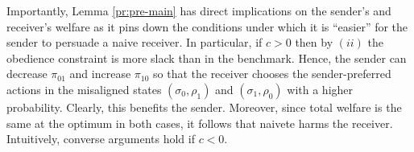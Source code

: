 \documentclass[12pt,english]{article}
\theoremstyle{plain}
\begin{document}
Importantly, Lemma \ref{pr:pre-main} has direct implications on the sender's and receiver's welfare as it pins down the conditions under which it is ``easier'' for the sender to persuade a naive receiver. 
In particular, if $c>0$ then by $(ii)$ the obedience constraint is more slack than in the benchmark. 
Hence, the sender can decrease $\pi_{01}$ and increase $\pi_{10}$ so that the receiver chooses the sender-preferred actions in the misaligned states $(\sigma_0,\rho_1)$ and $(\sigma_1,\rho_0)$ with a higher probability. 
Clearly, this benefits the sender.
Moreover, since total welfare is the same at the optimum in both cases, it follows that naivete harms the receiver.  
Intuitively, converse arguments hold if $c<0$. 

\end{document}
